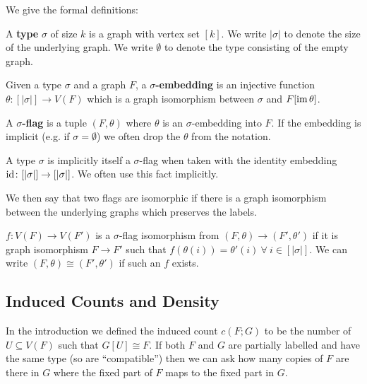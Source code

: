 We give the formal definitions:

\begin{definition}[Type]
    \label{def:type}
    A \textbf{type} $\sigma$ of size $k$ is a graph with vertex set $[k]$. We write
    $|\sigma|$ to denote the size of the underlying graph. We write
    $\emptyset$ to denote the type consisting of the empty graph.
\end{definition}
\begin{definition}
    Given a type $\sigma$ and a graph $F$, a \textbf{$\sigma$-embedding} is an injective
    function $\theta\colon[|\sigma|]\to V(F)$ which is a graph isomorphism between
    $\sigma$ and $F[\operatorname{im} \theta]$.
\end{definition}
\begin{definition}
    \label{def:sigma_flag}
    A \textbf{$\sigma$-flag} is a tuple $(F, \theta)$ where $\theta$ is an $\sigma$-embedding
    into $F$.
    If the embedding is implicit (e.g. if $\sigma=\emptyset$) we often drop the
    $\theta$ from the notation.
\end{definition}

\begin{note}
    A type $\sigma$ is implicitly itself a $\sigma$-flag when taken with the
    identity embedding $\mathrm{id}\colon [|\sigma|] \to [|\sigma|]$. We often use this fact
    implicitly.
\end{note}

We then say that two flags are isomorphic if there is a graph isomorphism between the underlying
graphs which preserves the labels.
\begin{definition}
    $f\colon V(F) \to V(F')$ is a $\sigma$-flag isomorphism
    from $(F,\theta) \to (F', \theta')$ if it is graph isomorphism $F \to F'$ such that
    $f(\theta(i)) = \theta'(i)\ \forall\ i\in [|\sigma|].$ We can
    write $(F,\theta)\cong (F',\theta')$ if such an $f$ exists.
\end{definition}

\subsection{Induced Counts and Density}

In the introduction we defined the induced count $c(F; G)$ to be the number of
$U\subseteq V(F)$ such that $G[U] \cong F$. If both $F$ and $G$ are partially labelled
and have the same type (so are ``compatible'') then we
can ask how many copies of $F$ are there in $G$ where the fixed part of $F$ maps to the
fixed part in $G$.

